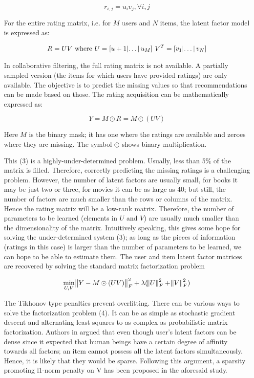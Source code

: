\documentclass[conference]{IEEEtran}
\begin{document}
\begin{equation}
  r_{i,j} = u_iv_j, \forall i,j
\end{equation}

For the entire rating matrix, i.e. for $M$ users and $N$ items, the latent factor model is expressed as:

\begin{equation}
  R = UV \text{ where } U = [u+1 \abs{\dots} u_M] \text{ } V^T = [v_1 \abs{\dots} v_N]
\end{equation}



In collaborative filtering, the full rating matrix is not available. A partially sampled version (the items for which users have provided ratings) are only available. The objective is to predict the missing values so that recommendations can be made based on those. The rating acquisition can be
mathematically expressed as:

\begin{equation}
  Y = M \odot R = M \odot (UV)
\end{equation}

Here $M$ is the binary mask; it has one where the ratings are available and zeroes where they are missing. The symbol $\odot$ shows binary multiplication.

This (3) is a highly-under-determined problem. Usually, less than 5\% of the matrix is filled. Therefore, correctly predicting the missing ratings is a challenging problem. However, the number of latent factors are usually small, for books it may be just two or three, for movies it can be as large as 40; but still, the number of factors are much smaller than the rows or columns of the matrix. Hence the rating matrix will be a low-rank matrix. Therefore, the number of parameters to be learned (elements in $U$ and $V$) are usually much smaller than the dimensionality of the matrix. Intuitively speaking, this gives some hope for solving the under-determined system (3); as long as the pieces of information (ratings in this case) is larger than the number of parameters to be learned, we can hope to be able to estimate them.
The user and item latent factor matrices are recovered by solving the standard matrix factorization problem

\begin{equation}
  \min_{U,V} \norm{Y-M \odot (UV)}^2_F + \lambda (\norm{U}^2_F+\norm{V}^2_F)
\end{equation}

The Tikhonov type penalties prevent overfitting. There can be various ways to solve the factorization problem (4). It can be as simple as stochastic gradient descent and alternating least squares to as complex as probabilistic matrix factorization.
Authors in \cite{Gogna1} argued that even though user’s latent factors can be dense since it expected that human beings have a certain degree of affinity towards all factors; an item cannot possess all the latent factors simultaneously. Hence, it is likely that they would be sparse. Following this argument, a sparsity promoting l1-norm penalty on V has been proposed in the aforesaid study.
\end{document}
